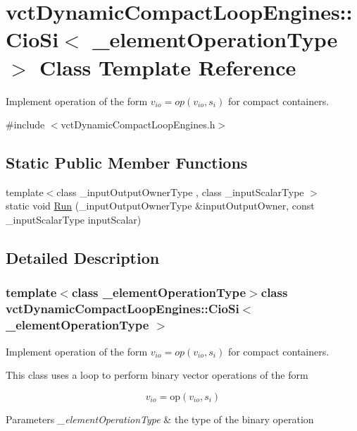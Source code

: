 \hypertarget{classvct_dynamic_compact_loop_engines_1_1_cio_si}{}\section{vct\+Dynamic\+Compact\+Loop\+Engines\+:\+:Cio\+Si$<$ \+\_\+element\+Operation\+Type $>$ Class Template Reference}
\label{classvct_dynamic_compact_loop_engines_1_1_cio_si}


Implement operation of the form $ v_{io} = op(v_{io}, s_i)$ for compact containers.  




{\ttfamily \#include $<$vct\+Dynamic\+Compact\+Loop\+Engines.\+h$>$}

\subsection*{Static Public Member Functions}
\begin{DoxyCompactItemize}
\item 
{\footnotesize template$<$class \+\_\+input\+Output\+Owner\+Type , class \+\_\+input\+Scalar\+Type $>$ }\\static void \hyperlink{classvct_dynamic_compact_loop_engines_1_1_cio_si_a541c1dc2827cf5c69322acaaefd024f0}{Run} (\+\_\+input\+Output\+Owner\+Type \&input\+Output\+Owner, const \+\_\+input\+Scalar\+Type input\+Scalar)
\end{DoxyCompactItemize}


\subsection{Detailed Description}
\subsubsection*{template$<$class \+\_\+element\+Operation\+Type$>$class vct\+Dynamic\+Compact\+Loop\+Engines\+::\+Cio\+Si$<$ \+\_\+element\+Operation\+Type $>$}

Implement operation of the form $ v_{io} = op(v_{io}, s_i)$ for compact containers. 

This class uses a loop to perform binary vector operations of the form

\[ v_{io} = \mathrm{op}(v_{io}, s_{i}) \]


\begin{DoxyParams}{Parameters}
{\em \+\_\+element\+Operation\+Type} & the type of the binary operation \\
\hline
\end{DoxyParams}


